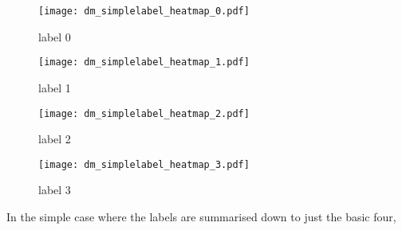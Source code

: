 \begin{figure}[H]
    \begin{minipage}{.45\linewidth}
        \centerline{\texttt{[image: dm\_simplelabel\_heatmap\_0.pdf]}}
        \caption{label 0}
        \label{fig:dm_sl_hm_0}
    \end{minipage}
    \hfill
    \begin{minipage}{.45\linewidth}
        \texttt{[image: dm\_simplelabel\_heatmap\_1.pdf]}
        \caption{label 1}
        \label{fig:dm_sl_hm_1}
    \end{minipage}
    \begin{minipage}{.45\linewidth}
        \centerline{\texttt{[image: dm\_simplelabel\_heatmap\_2.pdf]}}
        \caption{label 2}
        \label{fig:dm_sl_hm_2}
    \end{minipage}
    \hfill
    \begin{minipage}{.45\linewidth}
        \texttt{[image: dm\_simplelabel\_heatmap\_3.pdf]}
        \caption{label 3}
        \label{fig:dm_sl_hm_3}
    \end{minipage}

\end{figure}

In the simple case where the labels are summarised down to just the basic four, 

